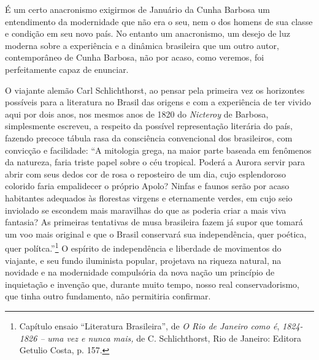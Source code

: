 É um certo anacronismo exigirmos de Januário da Cunha Barbosa um
entendimento da modernidade que não era o seu, nem o dos homens de sua
classe e condição em seu novo país. No entanto um anacronismo, um desejo
de luz moderna sobre a experiência e a dinâmica brasileira que um outro
autor, contemporâneo de Cunha Barbosa, não por acaso, como veremos, foi
perfeitamente capaz de enunciar.

O viajante alemão Carl Schlichthorst, ao pensar pela primeira vez os
horizontes possíveis para a literatura no Brasil das origens e com a
experiência de ter vivido aqui por dois anos, nos mesmos anos de 1820 do
\emph{Nicteroy} de Barbosa, simplesmente escreveu, a respeito da
possível representação literária do país, fazendo precoce tábula rasa da
consciência convencional dos brasileiros, com convicção e facilidade:
``A mitologia grega, na maior parte baseada em fenômenos da natureza,
faria triste papel sobre o céu tropical. Poderá a Aurora servir para
abrir com seus dedos cor de rosa o reposteiro de um dia, cujo
esplendoroso colorido faria empalidecer o próprio Apolo? Ninfas e faunos
serão por acaso habitantes adequados às florestas virgens e eternamente
verdes, em cujo seio inviolado se escondem mais maravilhas do que as
poderia criar a mais viva fantasia? As primeiras tentativas de musa
brasileira fazem já supor que tomará um voo mais original e que o Brasil
conservará sua independência, quer poética, quer polítca.''\footnote{Capítulo
  ensaio ``Literatura Brasileira'', de \emph{O Rio de Janeiro como é},
  \emph{1824-1826 --} \emph{uma vez e nunca mais,} de C. Schlichthorst,
  Rio de Janeiro: Editora Getulio Costa, p. 157.} O espírito de
independência e liberdade de movimentos do viajante, e seu fundo
iluminista popular, projetava na riqueza natural, na novidade e na
modernidade compulsória da nova nação um princípio de inquietação e
invenção que, durante muito tempo, nosso real conservadorismo, que tinha
outro fundamento, não permitiria confirmar.

